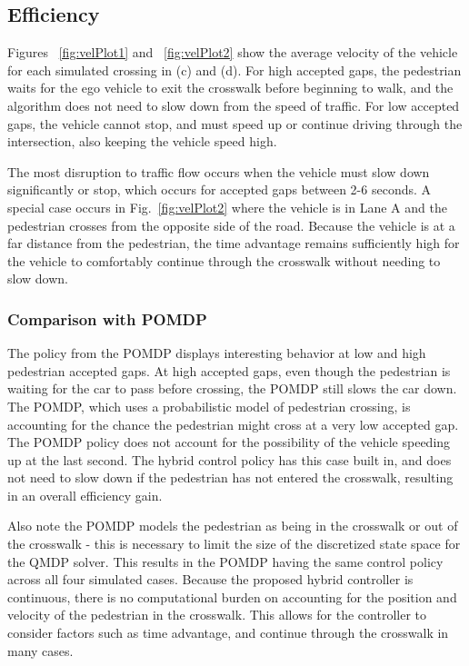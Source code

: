 \documentclass[letterpaper, 10 pt, conference]{ieeeconf} %
\begin{document}
\subsection{Efficiency}

 Figures ~\ref{fig:velPlot1} and ~\ref{fig:velPlot2} show the average velocity of the vehicle for each simulated crossing in (c) and (d). For high accepted gaps, the pedestrian waits for the ego vehicle to exit the crosswalk before beginning to walk, and the algorithm does not need to slow down from the speed of traffic. For low accepted gaps, the vehicle cannot stop, and must speed up or continue driving through the intersection, also keeping the vehicle speed high. 

The most disruption to traffic flow occurs when the vehicle must slow down significantly or stop, which occurs for accepted gaps between 2-6 seconds. A special case occurs in Fig.~\ref{fig:velPlot2} where the vehicle is in Lane A and the pedestrian crosses from the opposite side of the road. Because the vehicle is at a far distance from the pedestrian, the time advantage remains sufficiently high for the vehicle to comfortably continue through the crosswalk without needing to slow down. 

\subsubsection{Comparison with POMDP}
The policy from the POMDP displays interesting behavior at low and high pedestrian accepted gaps. At high accepted gaps, even though the pedestrian is waiting for the car to pass before crossing, the POMDP still slows the car down. The POMDP, which uses a probabilistic model of pedestrian crossing, is accounting for the chance the pedestrian might cross at a very low accepted gap. The POMDP policy does not account for the possibility of the vehicle speeding up at the last second. The hybrid control policy has this case built in, and does not need to slow down if the pedestrian has not entered the crosswalk, resulting in an overall efficiency gain. 

Also note the POMDP models the pedestrian as being in the crosswalk or out of the crosswalk - this is necessary to limit the size of the discretized state space for the QMDP solver. This results in the POMDP having the same control policy across all four simulated cases. Because the proposed hybrid controller is continuous, there is no computational burden on accounting for the position and velocity of the pedestrian in the crosswalk. This allows for the controller to consider factors such as time advantage, and continue through the crosswalk in many cases. 
\end{document}
